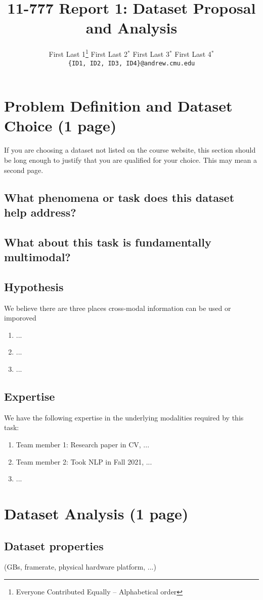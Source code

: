 \documentclass[11pt,a4paper]{article}
\title{11-777 Report 1: Dataset Proposal and Analysis}
\author{
  First Last 1\thanks{\hspace{4pt}Everyone Contributed Equally -- Alphabetical order} \hspace{2em} First Last 2$^*$ \hspace{2em} First Last 3$^*$ \hspace{2em} First Last 4$^*$ \\
  \texttt{\{ID1, ID2, ID3, ID4\}@andrew.cmu.edu}
  }
\date{}
\begin{document}
\maketitle

\section{Problem Definition and Dataset Choice (1 page)}
If you are choosing a dataset not listed on the course website, this section should be long enough to justify that you are qualified for your choice.  This may mean a second page.

\subsection{What phenomena or task does this dataset help address?}
\subsection{What about this task is fundamentally multimodal?}
\subsection{Hypothesis}
We believe there are three places cross-modal information can be used or imporoved
  \begin{enumerate}
    \item ...
    \item ...
    \item ...
  \end{enumerate}
\subsection{Expertise}
We have the following expertise in the underlying modalities required by this task:
  \begin{enumerate}
      \item Team member 1: Research paper in CV, ...
      \item Team member 2: Took NLP in Fall 2021, ...
      \item ...
  \end{enumerate}

\clearpage
\section{Dataset Analysis (1 page)}
\subsection{Dataset properties} (GBs, framerate, physical hardware platform, ...)
\end{document}
